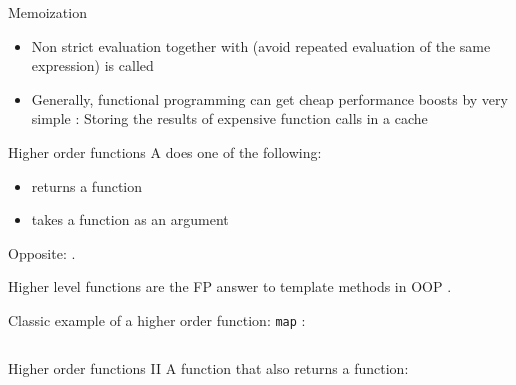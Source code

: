 \begin{frame}[t]{Memoization}
	\begin{itemize}
		\item<+-> Non strict evaluation together with  (avoid repeated evaluation of the same expression) is called 
		\item<+-> Generally, functional programming can get cheap performance boosts by very simple : Storing the results of expensive  function calls in a cache
		
	\end{itemize}
\end{frame}

\begin{frame}{Higher order functions}
	A  does one of the following:
	\begin{itemize}
		\item returns a function
		\item takes a function as an argument
	\end{itemize}
	Opposite: .
	
	\medskip 
	
	\medskip
	Higher level functions are the FP answer to template methods in OOP .
	
	\medskip
	Classic example of a higher order function: \texttt{map} :
	\inputminted[lastline=8]{python}{code/paradigms/fp/higher_order.py}
\end{frame}

\begin{frame}{Higher order functions II}
	A function that also returns a function:
	
	\inputminted[]{python}{code/paradigms/fp/higher_order_2.py}
\end{frame}

